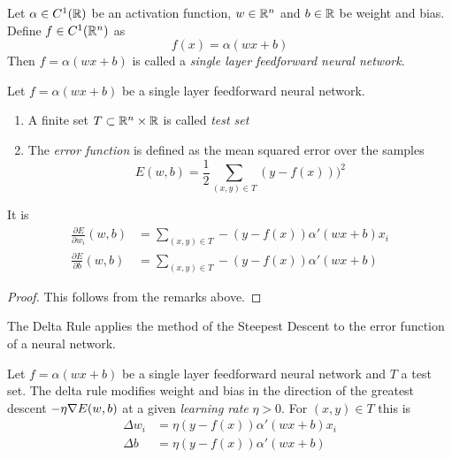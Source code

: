 \begin{definition}
    Let \( \alpha \in C^1(\mathbb{R}) \) be an activation function, \( w \in \mathbb{R}^n \)  and \( b \in \mathbb{R} \)
    be weight and bias. Define \( f \in C^1(\mathbb{R}^n) \) as
    \[
        f(x) = \alpha(w x + b)
    \]
    Then \( f = \alpha(wx + b) \) is called a \emph{single layer feedforward neural network}.
\end{definition}
\bigskip


\begin{definition}
    Let \( f = \alpha(wx + b) \) be a single layer feedforward neural network.
    \begin{enumerate}
        \item A finite set \( T \subset \mathbb{R}^n \times \mathbb{R} \) is called  \emph{test set}
        \item The \emph{error function} is defined as the mean squared error over the samples
              \[
                  E(w,b) = \frac{1}{2} \sum_{(x,y) \in T} (y - f(x)))^2
              \]
    \end{enumerate}
\end{definition}
\bigskip


\begin{lemma}
    It is
    \[
        \begin{split}
            \frac{\partial E}{\partial w_i}(w, b) &= \sum_{(x,y) \in T} - (y - f(x)) \alpha'(wx + b) x_i\\
            \frac{\partial E}{\partial b}(w, b) &= \sum_{(x,y) \in T} - (y - f(x)) \alpha'(wx + b)
        \end{split}
    \]
\end{lemma}

\begin{proof}
    This follows from the remarks above.
\end{proof}
\bigskip


The Delta Rule applies the method of the Steepest Descent to the error function of a neural network.
\bigskip


\begin{algorithm}\label{algo:delta_rule}
    Let \( f = \alpha(wx + b) \) be a single layer feedforward neural network
    and \( T \) a test set.
    The delta rule modifies weight and bias in the direction of the greatest descent \( - \eta \nabla E(w,b) \)
    at a given \emph{learning rate} \( \eta > 0 \).  For \( (x, y) \in T \) this is
    \[
        \begin{split}
            \Delta w_i & = \eta (y - f(x)) \alpha'(wx + b) x_i \\
            \Delta b & = \eta (y - f(x)) \alpha'(wx + b)
        \end{split}
    \]
\end{algorithm}
\bigskip


